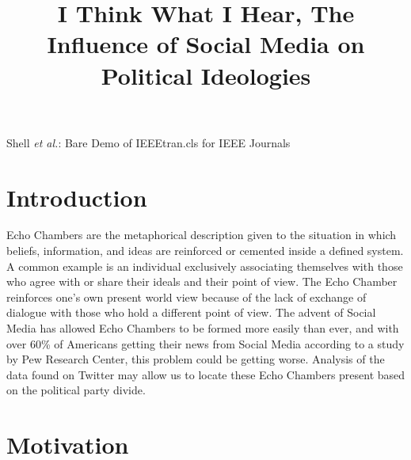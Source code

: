 \documentclass[journal]{IEEEtran}
\begin{document}
	
	
	\title{I Think What I Hear, The Influence of Social Media on Political Ideologies}
	
	
	\author{
	}
	
	{Shell \MakeLowercase{\textit{et al.}}: Bare Demo of IEEEtran.cls for IEEE Journals}
	
	
	\maketitle
	
	
	
	\IEEEpeerreviewmaketitle
	
	
	
	\section{Introduction}
	
	Echo Chambers are the metaphorical description given to the situation in which beliefs, information, and ideas are reinforced or cemented inside a defined system. A common example is an individual exclusively associating themselves with those who agree with or share their ideals and their point of view. The Echo Chamber reinforces one’s own present world view because of the lack of exchange of dialogue with those who hold a different point of view. The advent of Social Media has allowed Echo Chambers to be formed more easily than ever, and with over 60\% of Americans getting their news from Social Media according to a study by Pew Research Center, this problem could be getting worse. Analysis of the data found on Twitter may allow us to locate these Echo Chambers present based on the political party divide.
	
	\section{Motivation}
	
\end{document}
